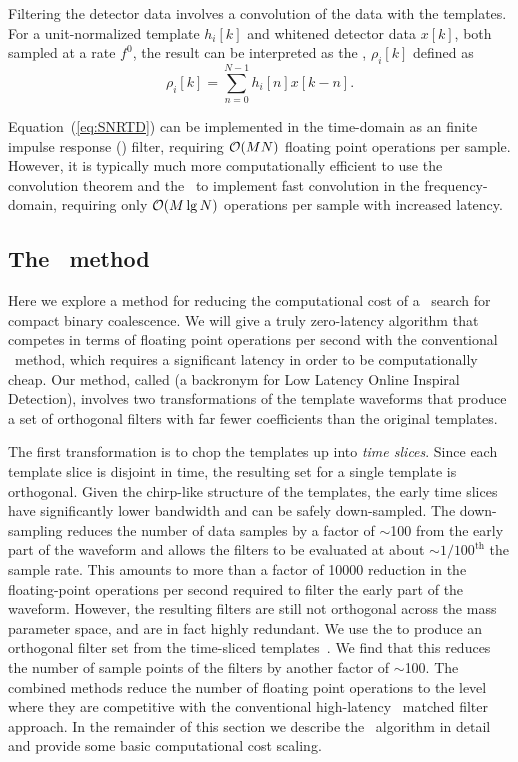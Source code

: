 Filtering the detector data involves a convolution of the data with the
templates.  For a unit-normalized template $h_i[k]$ and whitened detector data
$x[k]$, both sampled at a rate $f^0$, the result can be interpreted as the
\SNR{}, $\rho_i[k]$ defined as
%
%
\begin{equation}
	\label{eq:SNRTD}
	\rho_i [k] = \sum_{n=0}^{N-1} h_{i}[n] x [k-n].
\end{equation}

Equation~(\ref{eq:SNRTD}) can be implemented in the time-domain as an
finite impulse response (\fir) filter, requiring $\mathcal O(M
N)$ floating point operations per sample.  However, it is typically
much more computationally efficient to use the convolution theorem and the
\fft\ to implement fast convolution in the frequency-domain, requiring only
$\mathcal O(M \lg N)$ operations per sample with increased
latency.


\subsection{The \lloid\ method}

Here we explore a method for reducing the computational cost of a \TD\ search
for compact binary coalescence.  We will give a truly zero-latency algorithm
that competes in terms of floating point operations per second with the
conventional \FD\ method, which requires a significant latency in order to be
computationally cheap. Our method, called \lloid{} (a backronym for
Low Latency Online Inspiral Detection),
involves two transformations of the template waveforms that produce a set of
orthogonal filters with far fewer coefficients than the original templates.

The first transformation is to chop the \TD{} templates up into \emph{time
slices}.  Since each template slice is disjoint in time, the resulting set for
a single template is orthogonal.  Given the chirp-like structure of the
templates, the early time slices have significantly lower bandwidth and can be
safely down-sampled.  The down-sampling reduces the number of data samples by a
factor of $\sim$100 from the early part of the waveform and allows the filters
to be evaluated at about $\sim$$1/100^\mathrm{th}$ the sample rate. This
amounts to more than a factor of 10000
reduction in the floating-point operations per second required to filter the
early part of the waveform.  However, the resulting filters are still not
orthogonal across the mass parameter space, and are in fact highly redundant.
We use the \SVD{} to produce an orthogonal filter set
from the time-sliced templates~\citep{Cannon:2010p10398}.  We find that this
reduces the number of sample points of the filters by another factor of
$\sim$100.  The combined methods reduce the number of floating point operations
to the level where they are competitive with the conventional high-latency \FD\
matched filter approach.  In the remainder of this section we describe the
\lloid\ algorithm in detail and provide some basic computational cost scaling.  

